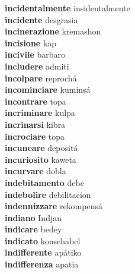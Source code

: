 \textbf{incidentalmente } insidentalmente \\
\textbf{incidente } desgrasia \\
\textbf{incinerazione } kremashon \\
\textbf{incisione } kap \\
\textbf{incivile } barbaro \\
\textbf{includere } admiti \\
\textbf{incolpare } reprochá \\
\textbf{incominciare } kuminsá \\
\textbf{incontrare } topa \\
\textbf{incriminare } kulpa \\
\textbf{incrinarsi } kibra \\
\textbf{incrociare } topa \\
\textbf{incuneare } depositá \\
\textbf{incuriosito } kaweta \\
\textbf{incurvare } dobla \\
\textbf{indebitamento } debe \\
\textbf{indebolire } debilitacion \\
\textbf{indennizzare } rekompensá \\
\textbf{indiano } Indjan \\
\textbf{indicare } bedey \\
\textbf{indicato } konsehabel \\
\textbf{indifferente } apátiko \\
\textbf{indifferenza } apatia \\
